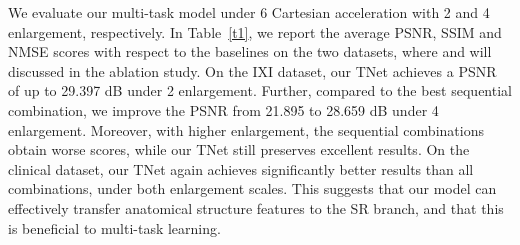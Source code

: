 \documentclass[runningheads]{llncs}
\begin{document}
We evaluate our multi-task model under 6 Cartesian acceleration with 2 and 4 enlargement, respectively. In Table~\ref{t1}, we report the average PSNR, SSIM and NMSE scores with respect to the baselines on the two datasets, where   and   will discussed in the ablation study. On the IXI dataset, our TNet achieves a PSNR of up to 29.397 dB under 2 enlargement. Further, compared to the best sequential combination, we improve the PSNR from 21.895 to 28.659 dB under 4 enlargement. Moreover, with higher enlargement, the sequential combinations obtain worse scores, while our TNet still preserves excellent results. 
On the clinical dataset, our TNet again achieves significantly better results than all combinations, under both enlargement scales. This suggests that our model can effectively transfer anatomical structure features to the SR branch, and that this is beneficial to multi-task learning.


\begin{table*}[t]
 \centering
 \caption{Quantitative results on the two datasets under different enlargement scales. }
\label{t1}
\end{table*}
\end{document}
